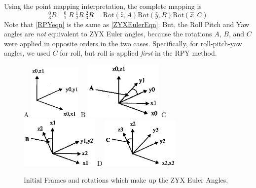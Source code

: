 Using the point mapping interpretation, the complete mapping is
\begin{equation}\label{ZYXEulerEqn}
^0_3R = ^0_1R\;^1_2R\;^2_3R = \mathrm{Rot}(\hat{z},A)\mathrm{Rot}(\hat{y},B)\mathrm{Rot}(\hat{x},C)
\end{equation}
Note that \eqref{RPYeqn} is the same as \eqref{ZYXEulerEqn}.   But, the Roll Pitch and Yaw angles are {\it not} equivalent to ZYX Euler angles, because the rotations $A$, $B$, and $C$ were applied in opposite orders in the two cases.  Specifically, for roll-pitch-yaw angles, we used $C$ for roll, but roll is applied {\it first} in the RPY method.
\begin{figure}[h]
A \includegraphics[width=1.0in]{figs02/00328.eps}
B \includegraphics[width=1.5in]{figs02/00329.eps}
C \includegraphics[width=1.5in]{figs02/00330.eps}
D \includegraphics[width=1.5in]{figs02/00331.eps}
\caption{Initial Frames and rotations which make up the ZYX Euler Angles.}\label{ZYXEulerRotations}
\end{figure}
%
%
%
%


